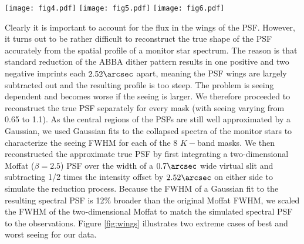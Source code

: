 \documentclass{emulateapj}
\begin{document}
\begin{figure*}
\texttt{[image: fig4.pdf]}	
\texttt{[image: fig5.pdf]}
\texttt{[image: fig6.pdf]}
\caption{Examples of spatial profiles of MOSFIRE PSFs. The solid and dashed curves are theoretically derived Moffat and Gaussian intensity profiles, respectively. They are shown at logarithmic scale in the left panel. A Moffat is a good representation of the original MOSFIRE PSF, but sky subtraction in the reduction process leaves negative imprints on each sides, which will subtract the strong wings. This makes the reduced PSF appear Gaussian. This is illustrated by the two examples of spatial profiles of monitor stars in the middle and right panels, with best and worst seeing, respectively. The black datapoints represent the star spectra collapsed in the wavelength direction. {The solid and dashed lines} are the {reconstructed Moffat} PSFs {and the one-dimensional Gaussian fits}, showing that {they} are nearly indistinguishable {in one dimension}.}
\label{fig:wings}
\end{figure*}	

Clearly it is important to account for the flux in the wings of the PSF. However, it turns out to be rather difficult to reconstruct the true shape of the PSF accurately from the spatial profile of a monitor star spectrum. The reason is that standard reduction of the ABBA dither pattern results in one positive and two negative imprints each $2.52\arcsec$ apart, meaning the PSF wings are largely subtracted out and the resulting profile is too steep. The problem is seeing dependent and becomes worse if the seeing is larger. We therefore proceeded to reconstruct the true PSF separately for every mask (with seeing varying from 0.65 to 1.1\arcsec). 
As the central regions of the PSFs are still well approximated by a Gaussian, we used Gaussian fits to the collapsed spectra of the monitor stars to characterize the seeing FWHM for each of the 8 $K-$band masks. We then reconstructed the approximate true PSF by first integrating a two-dimensional Moffat ($\beta=2.5$) PSF over the width of a $0.7\arcsec$ wide virtual slit and subtracting 1/2 times the intensity offset by $2.52\arcsec$ on either side to simulate the reduction process. Because the FWHM of a Gaussian fit to the resulting spectral PSF is 12\% broader than the original Moffat FWHM, we scaled the FWHM of the two-dimensional Moffat to match the simulated spectral PSF to the observations. Figure \ref{fig:wings} illustrates two extreme cases of best and worst seeing {for our data}.
\end{document}
